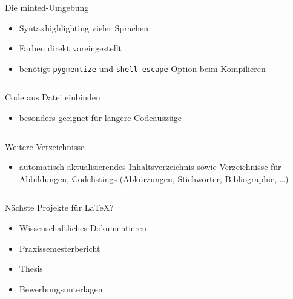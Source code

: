 \documentclass[presentation,aspectratio=169]{beamer}
\begin{document}
\begin{frame}[fragile]{Die minted-Umgebung}
  \begin{itemize}
    \item Syntaxhighlighting vieler Sprachen
    \item Farben direkt voreingestellt
    \item benötigt \verb|pygmentize| und \verb|shell-escape|-Option beim Kompilieren
  \end{itemize}
  \begin{minipage}{.4\textwidth}
    
  \end{minipage}
  \hfill
  \begin{minipage}{.5\textwidth}
    \inputminted{latex}{codebeispiele/listings-minted.tex}
  \end{minipage}
\end{frame}

\begin{frame}[fragile]{Code aus Datei einbinden}
  \begin{itemize}
    \item besonders geeignet für längere Codeauszüge
  \end{itemize}
  \begin{minipage}{.4\textwidth}
    
  \end{minipage}
  \hfill
  \begin{minipage}{.5\textwidth}
    \inputminted{latex}{codebeispiele/listings-from-file.tex}
  \end{minipage}
\end{frame}

\begin{frame}[fragile]{Weitere Verzeichnisse}
  \begin{itemize}
    \item automatisch aktualisierendes Inhaltsverzeichnis sowie Verzeichnisse für Abbildungen, Codelistings (Abkürzungen, Stichwörter, Bibliographie, \dots)
  \end{itemize}
  \inputminted{latex}{codebeispiele/list-of-everything.tex}
\end{frame}

\begin{frame}{Nächste Projekte für \LaTeX{}?}
  \begin{itemize}
    \item Wissenschaftliches Dokumentieren
    \item Praxissemesterbericht
    \item Thesis
    \bigskip
    \item Bewerbungsunterlagen
  \end{itemize}
\end{frame}
\end{document}
